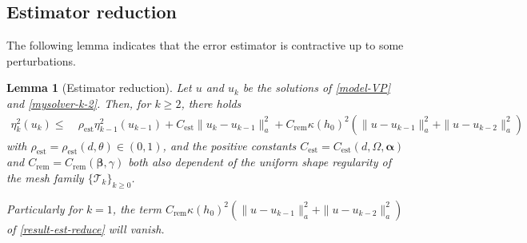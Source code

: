 \documentclass[preprint,times]{elsarticle}%
\newtheorem{lemma}{Lemma}[section]
\numberwithin{algorithm}{section}
\numberwithin{equation}{section}
\newcommand{\bnd}{\mathrm{bnd}}
\newcommand{\est}{\mathrm{est}}
\newcommand{\rem}{\mathrm{rem}}
\newcommand{\anorm}[1]{\|#1\|_a}
\newcommand{\valpha}{\boldsymbol{\alpha}}
\newcommand{\vbeta}{\boldsymbol{\beta}}
\newcommand{\hmcP}{\hat{\mathcal{P}}}
\newcommand{\mcT}{\mathcal{T}}
\newcommand{\mbI}{\mathbb{I}}
\newcommand{\mbV}{\mathbb{V}}
\def\leq{\leqslant}
\def\geq{\geqslant}
\begin{document}
%	


\subsection{Estimator reduction}
The following lemma indicates that the error estimator is contractive up to some perturbations. 
\begin{lemma}[Estimator reduction]\label{lem-est-reduce} 
	Let $u$ and $u_k$ be the solutions of \eqref{model-VP} and \eqref{mysolver-k-2}. Then, for $k \geq 2$, there holds
	\begin{align}
		\eta_k^2(u_k) \leqslant~& \rho_\est \eta_{k-1}^2(u_{k-1}) 
+ C_\est\anorm{u_k-u_{k-1}}^2+ C_\rem \kappa(h_0)^2\left(\anorm{u-u_{k-1}}^2 + \anorm{u-u_{k-2}}^2\right)
\label{result-est-reduce}
	\end{align}
with $\rho_\est = \rho_\est(d,\theta) \in (0,1)$, and the positive constants $C_\est = C_\est(d,\Omega,\valpha)$ and $C_\rem =  C_\rem(\vbeta,\gamma)$ both also dependent of the uniform shape regularity of the mesh family $\{\mcT_k\}_{k \geq 0}$. 

Particularly for $k = 1$, the term $C_\rem \kappa(h_0)^2(\anorm{u-u_{k-1}}^2 + \anorm{u-u_{k-2}}^2)$ of \eqref{result-est-reduce} will vanish. 
\end{lemma}
\end{document}
